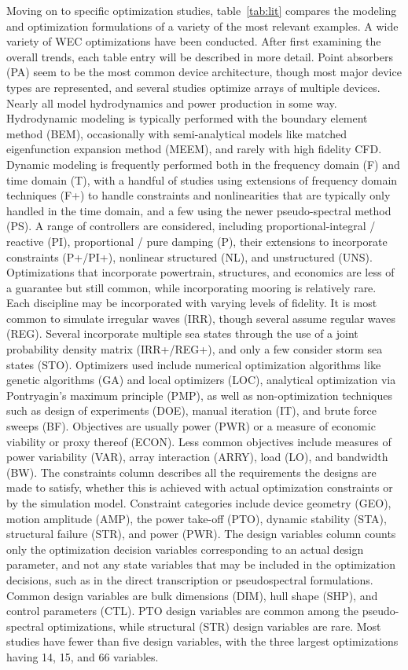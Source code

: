 Moving on to specific optimization studies, table~\ref{tab:lit} compares the modeling and optimization formulations of a variety of the most relevant examples. A wide variety of WEC optimizations have been conducted. After first examining the overall trends, each table entry will be described in more detail. Point absorbers (PA) seem to be the most common device architecture, though most major device types are represented, and several studies optimize arrays of multiple devices. Nearly all model hydrodynamics and power production in some way. Hydrodynamic modeling is typically performed with the boundary element method (BEM), occasionally with semi-analytical models like matched eigenfunction expansion method (MEEM), and rarely with high fidelity CFD. Dynamic modeling is frequently performed both in the frequency domain (F) and time domain (T), with a handful of studies using extensions of frequency domain techniques (F+) to handle constraints and nonlinearities that are typically only handled in the time domain, and a few using the newer pseudo-spectral method (PS). A range of controllers are considered, including proportional-integral / reactive (PI), proportional / pure damping (P), their extensions to incorporate constraints (P+/PI+), nonlinear structured (NL), and unstructured (UNS). Optimizations that incorporate powertrain, structures, and economics are less of a guarantee but still common, while incorporating mooring is relatively rare. Each discipline may be incorporated with varying levels of fidelity. It is most common to simulate irregular waves (IRR), though several assume regular waves (REG). Several incorporate multiple sea states through the use of a joint probability density matrix (IRR+/REG+), and only a few consider storm sea states (STO). Optimizers used include numerical optimization algorithms like genetic algorithms (GA) and local optimizers (LOC), analytical optimization via Pontryagin's maximum principle (PMP), as well as non-optimization techniques such as design of experiments (DOE), manual iteration (IT), and brute force sweeps (BF). Objectives are usually power (PWR) or a measure of economic viability or proxy thereof (ECON). Less common objectives include measures of power variability (VAR), array interaction (ARRY), load (LO), and bandwidth (BW). The constraints column describes all the requirements the designs are made to satisfy, whether this is achieved with actual optimization constraints or by the simulation model. Constraint categories include device geometry (GEO), motion amplitude (AMP), the power take-off (PTO), dynamic stability (STA), structural failure (STR), and power (PWR). The design variables column counts only the optimization decision variables corresponding to an actual design parameter, and not any state variables that may be included in the optimization decisions, such as in the direct transcription or pseudospectral formulations. Common design variables are bulk dimensions (DIM), hull shape (SHP), and control parameters (CTL). PTO design variables are common among the pseudo-spectral optimizations, while structural (STR) design variables are rare. Most studies have fewer than five design variables, with the three largest optimizations having 14, 15, and 66 variables.

